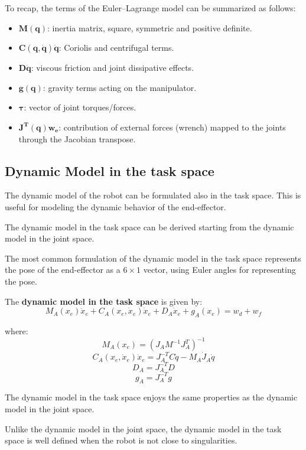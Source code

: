 \hfill

To recap, the terms of the Euler--Lagrange model can be summarized as follows:

\begin{itemize}
    \item $\mathbf{M(q)}$: inertia matrix, square, symmetric and positive definite.
    \item $\mathbf{C(q,\dot{q})\dot{q}}$: Coriolis and centrifugal terms.
    \item $\mathbf{D\dot{q}}$: viscous friction and joint dissipative effects.
    \item $\mathbf{g(q)}$: gravity terms acting on the manipulator.
    \item $\mathbf{\tau}$: vector of joint torques/forces.
    \item $\mathbf{J^T(q)w_e}$: contribution of external forces (wrench) mapped to the joints through the Jacobian transpose.
\end{itemize}

\hfill

\subsection{Dynamic Model in the task space}

The dynamic model of the robot can be formulated also in the task space. This is useful for modeling the dynamic behavior of the end-effector.  

The dynamic model in the task space can be derived starting from the dynamic model in the joint space.  

The most common formulation of the dynamic model in the task space represents the pose of the end-effector as a $6 \times 1$ vector, using Euler angles for representing the pose.

The \textbf{dynamic model in the task space} is given by:
\[
    M_A(x_e)\ddot{x}_e + C_A(x_e, \dot{x}_e)\dot{x}_e + D_A\dot{x}_e + g_A(x_e) = w_d + w_f
\]

where:
\[
    M_A(x_e) = \left(J_A M^{-1} J_A^T \right)^{-1}
\]
\[
    C_A(x_e, \dot{x}_e)\dot{x}_e = J_A^{-T} C \dot{q} - M_A \dot{J}_A \dot{q}
\]
\[
    D_A = J_A^{-T} D
\]
\[
    g_A = J_A^{-T} g
\]

\hfill

The dynamic model in the task space enjoys the same properties as the dynamic model in the joint space.  

Unlike the dynamic model in the joint space, the dynamic model in the task space is well defined when the robot is not close to singularities.  

\newpage